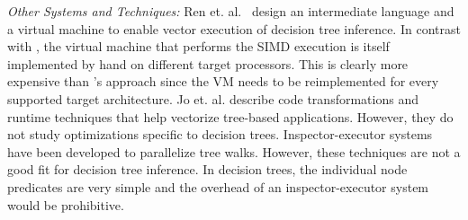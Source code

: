 \emph{Other Systems and Techniques:} Ren et. al.~\cite{PortableVM} design an
intermediate language and a virtual machine to enable vector execution of decision tree
inference. In contrast with \Treebeard{}, the virtual machine that performs the SIMD 
execution is itself implemented by hand on different target processors. This is clearly 
more expensive than \Treebeard{}'s approach since the VM
needs to be reimplemented for every supported target architecture.
Jo et. al.\cite{MilindTreeVectorization} describe code transformations and runtime 
techniques that help vectorize tree-based applications. However, they do not 
study optimizations specific to decision trees.
Inspector-executor systems \cite{TaoOfParallelism,HybridCPUGPU} have been 
developed to parallelize tree walks. However, these techniques are not a good fit 
for decision tree inference. In decision trees, the individual node predicates are very 
simple and the overhead of an inspector-executor system would be prohibitive.


